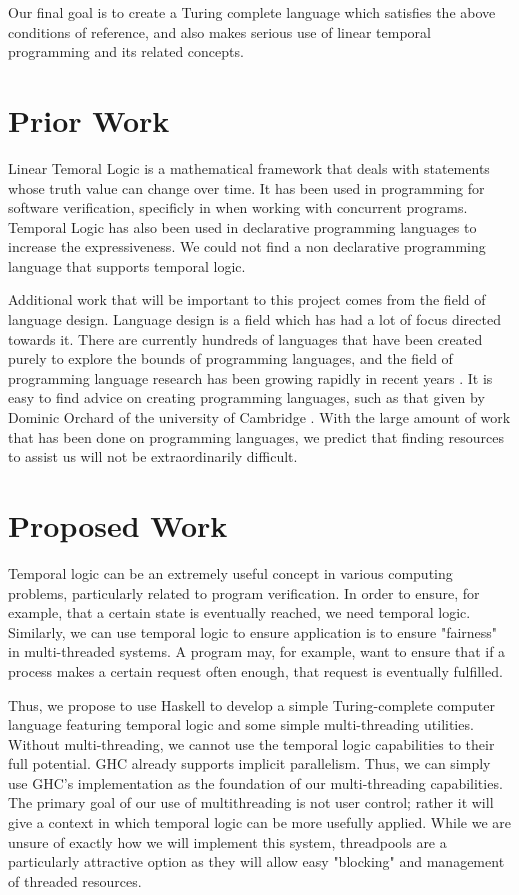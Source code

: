 \documentclass[numbers]{sigplanconf}
\begin{document}
Our final goal is to create a Turing complete language which satisfies
the above conditions of reference, and also makes serious use of linear temporal programming and its related concepts.

\section{Prior Work}
 

Linear Temoral Logic is a mathematical framework that deals with
statements whose truth value can change over time. It has been used in programming for
software verification, specificly in when working with concurrent
programs\cite{AutomaticVerification, SimpleVerification}. Temporal
Logic has also been used in declarative programming languages to
increase the expressiveness\cite{DeclarativeTemporal}. We could not find a non declarative programming language that
supports temporal logic. 

Additional work that will be important to this project comes from the field of language design.
Language design is a field which has had a lot of focus directed
towards it. There are currently hundreds of languages that
have been created purely to explore the bounds of programming languages, and the field of programming language research has been growing rapidly in recent years \cite{esolang}. It is easy to find advice on
creating programming languages, such as that given by Dominic Orchard
of the university of Cambridge \cite{4Rs}.  With the large amount of work
that has been done on programming languages, we predict that finding
resources to assist us will not be extraordinarily difficult.

\section{Proposed Work}
Temporal logic can be an extremely useful concept in various 
computing problems, particularly related to program verification. 
In order to ensure, for example, that a certain state is eventually
reached,
 we need temporal logic. Similarly, we can use temporal logic to
 ensure
 application is to ensure "fairness" in multi-threaded systems. A program may, 
for example, want to ensure that if a process makes a certain request 
often enough, that request is eventually fulfilled.

Thus, we propose to use Haskell to develop a simple Turing-complete
 computer language featuring temporal logic and some simple
 multi-threading
 utilities. Without multi-threading, we cannot use the temporal logic 
capabilities to their full potential. GHC already supports implicit
parallelism.
 Thus, we can simply use GHC's implementation as the foundation
 of our multi-threading capabilities.
 The primary goal of our use of multithreading is not user control;
 rather it will give a context in which temporal logic can be more
 usefully applied. While we are unsure of exactly how we will
 implement this system, threadpools are a particularly attractive
 option as they will allow easy "blocking" and management of 
 threaded resources.
\end{document}
